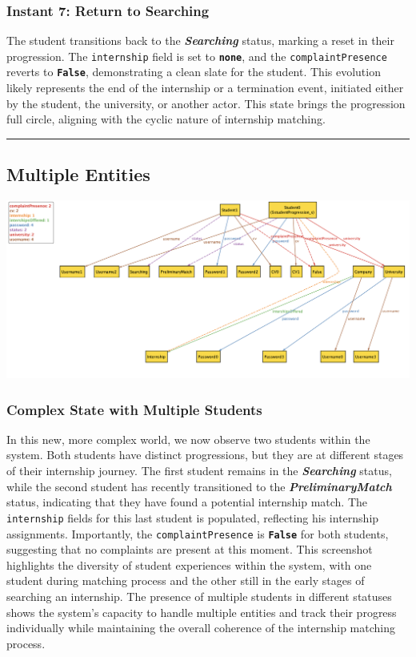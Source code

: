 \subsubsection*{Instant 7: Return to Searching}
The student transitions back to the \textbf{\textit{Searching}} status, marking a reset in their progression. The \texttt{internship} field is set to \textbf{\texttt{none}}, and the \texttt{complaintPresence} reverts to \textbf{\texttt{False}}, demonstrating a clean slate for the student. This evolution likely represents the end of the internship or a termination event, initiated either by the student, the university, or another actor. This state brings the progression full circle, aligning with the cyclic nature of internship matching.
\\
\hrule

\subsection{Multiple Entities}

\vspace{5mm}
\includegraphics[width=\textwidth]{complex.png}

\subsubsection*{Complex State with Multiple Students} In this new, more complex world, we now observe two students within the system. Both students have distinct progressions, but they are at different stages of their internship journey. The first student remains in the \textbf{\textit{Searching}} status, while the second student has recently transitioned to the \textbf{\textit{PreliminaryMatch}} status, indicating that they have found a potential internship match. The \texttt{internship} fields for this last student is populated, reflecting his internship assignments. Importantly, the \texttt{complaintPresence} is \textbf{\texttt{False}} for both students, suggesting that no complaints are present at this moment. This screenshot highlights the diversity of student experiences within the system, with one student during matching process and the other still in the early stages of searching an internship. The presence of multiple students in different statuses shows the system's capacity to handle multiple entities and track their progress individually while maintaining the overall coherence of the internship matching process.